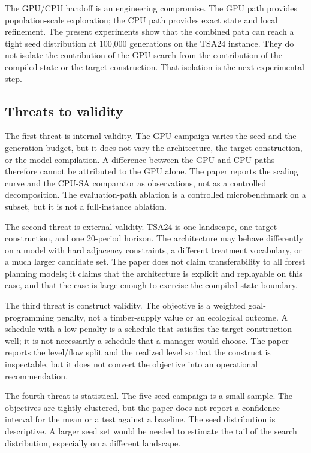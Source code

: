 \documentclass[preprint,11pt]{elsarticle}
\begin{document}
The GPU/CPU handoff is an engineering compromise. The GPU path provides
population-scale exploration; the CPU path provides exact state and local
refinement. The present experiments show that the combined path can reach a
tight seed distribution at 100,000 generations on the TSA24 instance. They do
not isolate the contribution of the GPU search from the contribution of the
compiled state or the target construction. That isolation is the next
experimental step.

\subsection{Threats to validity}

The first threat is internal validity. The GPU campaign varies the seed and the generation budget, but
it does not vary the architecture, the target construction, or the model compilation. A difference
between the GPU and CPU paths therefore cannot be attributed to the GPU alone. The paper reports the
scaling curve and the CPU-SA comparator as observations, not as a controlled decomposition. The
evaluation-path ablation is a controlled microbenchmark on a subset, but it is not a full-instance
ablation.

The second threat is external validity. TSA24 is one landscape, one target construction, and one
20-period horizon. The architecture may behave differently on a model with hard adjacency constraints,
a different treatment vocabulary, or a much larger candidate set. The paper does not claim
transferability to all forest planning models; it claims that the architecture is explicit and
replayable on this case, and that the case is large enough to exercise the compiled-state boundary.

The third threat is construct validity. The objective is a weighted goal-programming penalty, not a
timber-supply value or an ecological outcome. A schedule with a low penalty is a schedule that
satisfies the target construction well; it is not necessarily a schedule that a manager would choose.
The paper reports the level/flow split and the realized level so that the construct is inspectable, but
it does not convert the objective into an operational recommendation.

The fourth threat is statistical. The five-seed campaign is a small sample. The objectives are tightly
clustered, but the paper does not report a confidence interval for the mean or a test against a
baseline. The seed distribution is descriptive. A larger seed set would be needed to estimate the
tail of the search distribution, especially on a different landscape.
\end{document}
